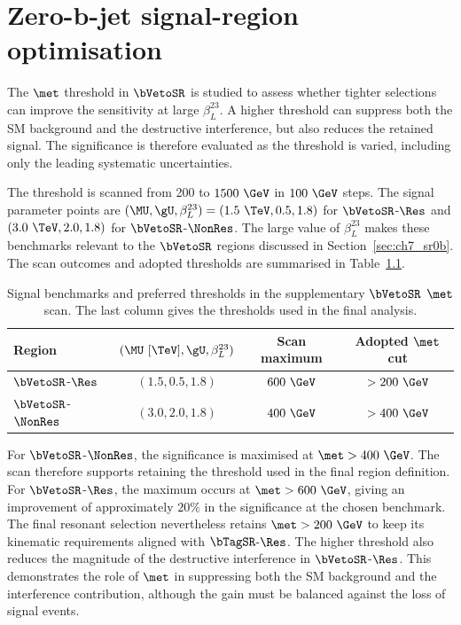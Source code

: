 \chapter{Zero-b-jet signal-region optimisation}
\label{app:sr0b_optimisation}

The $\met$ threshold in $\bVetoSR$ is studied to assess whether tighter selections can improve the sensitivity at large $\beta_L^{23}$.
A higher threshold can suppress both the SM background and the destructive interference, but also reduces the retained signal.
The significance is therefore evaluated as the threshold is varied, including only the leading systematic uncertainties.

The threshold is scanned from 200 to $1500~\GeV$ in $100~\GeV$ steps.
The signal parameter points are $(\MU,\gU,\beta_L^{23})=(1.5~\TeV,0.5,1.8)$ for $\bVetoSR$-$\Res$ and $(3.0~\TeV,2.0,1.8)$ for $\bVetoSR$-$\NonRes$.
The large value of $\beta_L^{23}$ makes these benchmarks relevant to the $\bVetoSR$ regions discussed in Section~\ref{sec:ch7_sr0b}.
The scan outcomes and adopted thresholds are summarised in Table~\ref{tab:app_sr0b_scan}.

\begin{table}[htbp]
    \centering
    \small
    \caption{Signal benchmarks and preferred thresholds in the supplementary $\bVetoSR$ $\met$ scan. The last column gives the thresholds used in the final analysis.}
    \label{tab:app_sr0b_scan}
    \begin{tabular}{lccc}
        \toprule
        Region & $(\MU~[\TeV],\gU,\beta_L^{23})$ & Scan maximum & Adopted $\met$ cut \\
        \midrule
        $\bVetoSR$-$\Res$ & $(1.5,0.5,1.8)$ & $600~\GeV$ & $>200~\GeV$ \\
        $\bVetoSR$-$\NonRes$ & $(3.0,2.0,1.8)$ & $400~\GeV$ & $>400~\GeV$ \\
        \bottomrule
    \end{tabular}
\end{table}

For $\bVetoSR$-$\NonRes$, the significance is maximised at $\met>400~\GeV$.
The scan therefore supports retaining the threshold used in the final region definition.
For $\bVetoSR$-$\Res$, the maximum occurs at $\met>600~\GeV$, giving an improvement of approximately $20\%$ in the significance at the chosen benchmark.
The final resonant selection nevertheless retains $\met>200~\GeV$ to keep its kinematic requirements aligned with $\bTagSR$-$\Res$.
The higher threshold also reduces the magnitude of the destructive interference in $\bVetoSR$-$\Res$.
This demonstrates the role of $\met$ in suppressing both the SM background and the interference contribution, although the gain must be balanced against the loss of signal events.

